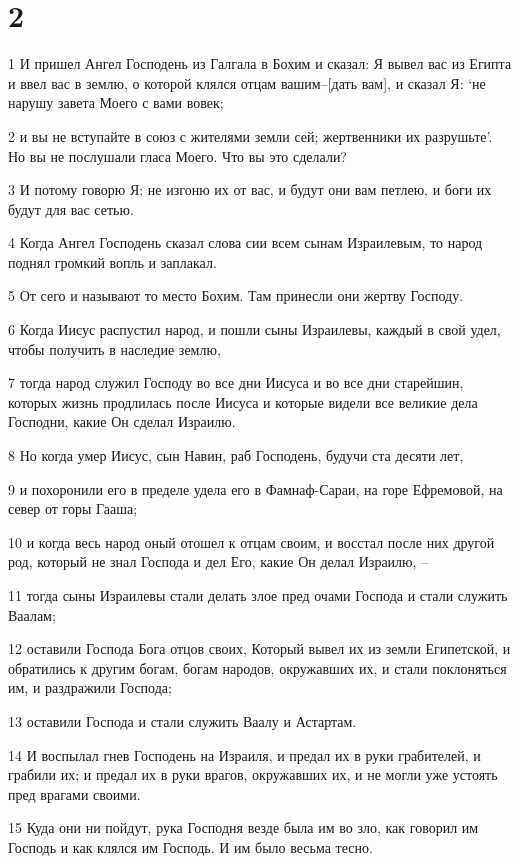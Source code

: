 \chapter{2}

\par 1 И пришел Ангел Господень из Галгала в Бохим и сказал: Я вывел вас из Египта и ввел вас в землю, о которой клялся отцам вашим--[дать вам], и сказал Я: `не нарушу завета Моего с вами вовек;
\par 2 и вы не вступайте в союз с жителями земли сей; жертвенники их разрушьте'. Но вы не послушали гласа Моего. Что вы это сделали?
\par 3 И потому говорю Я: не изгоню их от вас, и будут они вам петлею, и боги их будут для вас сетью.
\par 4 Когда Ангел Господень сказал слова сии всем сынам Израилевым, то народ поднял громкий вопль и заплакал.
\par 5 От сего и называют то место Бохим. Там принесли они жертву Господу.
\par 6 Когда Иисус распустил народ, и пошли сыны Израилевы, каждый в свой удел, чтобы получить в наследие землю,
\par 7 тогда народ служил Господу во все дни Иисуса и во все дни старейшин, которых жизнь продлилась после Иисуса и которые видели все великие дела Господни, какие Он сделал Израилю.
\par 8 Но когда умер Иисус, сын Навин, раб Господень, будучи ста десяти лет,
\par 9 и похоронили его в пределе удела его в Фамнаф-Сараи, на горе Ефремовой, на север от горы Гааша;
\par 10 и когда весь народ оный отошел к отцам своим, и восстал после них другой род, который не знал Господа и дел Его, какие Он делал Израилю, --
\par 11 тогда сыны Израилевы стали делать злое пред очами Господа и стали служить Ваалам;
\par 12 оставили Господа Бога отцов своих, Который вывел их из земли Египетской, и обратились к другим богам, богам народов, окружавших их, и стали поклоняться им, и раздражили Господа;
\par 13 оставили Господа и стали служить Ваалу и Астартам.
\par 14 И воспылал гнев Господень на Израиля, и предал их в руки грабителей, и грабили их; и предал их в руки врагов, окружавших их, и не могли уже устоять пред врагами своими.
\par 15 Куда они ни пойдут, рука Господня везде была им во зло, как говорил им Господь и как клялся им Господь. И им было весьма тесно.
